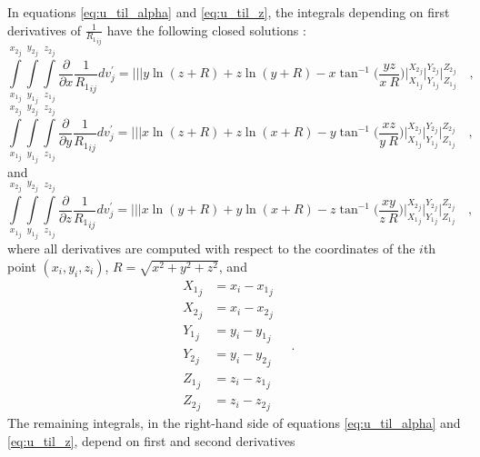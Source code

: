\documentclass[journal abbreviation, manuscript]{copernicus}
\begin{document}
In equations  \ref{eq:u_til_alpha} and \ref{eq:u_til_z}, the integrals depending on 
first derivatives of ${\frac{1}{{R_1}_{ij}}}$ have the following closed solutions 
\citep{Nagyetal2000, Nagyetal2002}:
\begin{equation}
\int\limits_{{x_{1}}_{j}}^{{x_{2}}_{j}} \int\limits_{{y_{1}}_{j}}^{{y_{2}}_{j}} \int\limits_{{z_{1}}_{j}}^{{z_{2}}_{j}}
\frac{\partial }{\partial x} {\frac{1}{{R_1}_{ij}}} dv_{j}^{\prime} =
\Bigg|\Bigg|\Bigg| 
y \ln(z + R) + z \ln(y + R) -  x  \tan^{-1} \Bigg( \frac{yz}{x \: R} \Bigg) 
\Bigg|_{{X_1}_{j}}^{{X_2}_{j}} \Bigg|_{{Y_1}_{j}}^{{Y_2}_{j}} \Bigg|_{{Z_1}_{j}}^{{Z_2}_{j}} \quad ,
\label{dx1}
\end{equation}
\begin{equation}
\int\limits_{{x_{1}}_{j}}^{{x_{2}}_{j}} \int\limits_{{y_{1}}_{j}}^{{y_{2}}_{j}} \int\limits_{{z_{1}}_{j}}^{{z_{2}}_{j}}
\frac{\partial }{\partial y} {\frac{1}{{R_1}_{ij}}} dv_{j}^{\prime} =
\Bigg|\Bigg|\Bigg|
x \ln(z + R) + z \ln(x + R) -  y  \tan^{-1} \Bigg( \frac{xz}{y \: R} 
\Bigg)
\Bigg|_{{X_1}_{j}}^{{X_2}_{j}} \Bigg|_{{Y_1}_{j}}^{{Y_2}_{j}} \Bigg|_{{Z_1}_{j}}^{{Z_2}_{j}} \quad ,
\label{dy1}
\end{equation}
and
\begin{equation}
\int\limits_{{x_{1}}_{j}}^{{x_{2}}_{j}} \int\limits_{{y_{1}}_{j}}^{{y_{2}}_{j}} \int\limits_{{z_{1}}_{j}}^{{z_{2}}_{j}}
\frac{\partial }{\partial z} {\frac{1}{{R_1}_{ij}}} dv_{j}^{\prime} =
\Bigg|\Bigg|\Bigg|
x \ln(y + R) + y \ln(x + R) -  z  \tan^{-1} \Bigg( \frac{xy}{z \: R} \Bigg) 
\Bigg|_{{X_1}_{j}}^{{X_2}_{j}} \Bigg|_{{Y_1}_{j}}^{{Y_2}_{j}} \Bigg|_{{Z_1}_{j}}^{{Z_2}_{j}} \quad ,
\label{dz1}
\end{equation}
where all derivatives are computed with respect to the coordinates of the $i$th point 
$(x_i, y_i, z_i)$, $R = \sqrt{x^{2} + y^{2} + z^{2}}$, and
\begin{equation}
\begin{array}{ll}
{X_1}_{j} &= x_i - {x_1}_{j} \\
{X_2}_{j} &= x_i - {x_2}_{j} \\
{Y_1}_{j} &= y_i - {y_1}_{j} \\
{Y_2}_{j} &= y_i - {y_2}_{j} \\
{Z_1}_{j} &= z_i - {z_1}_{j} \\
{Z_2}_{j} &= z_i - {z_2}_{j}
\end{array} \quad .
\label{eq:Nagy_limits_1}
\end{equation}
The remaining integrals, in the right-hand side of equations 
\ref{eq:u_til_alpha} and \ref{eq:u_til_z}, depend on first and second derivatives 
\end{document}
